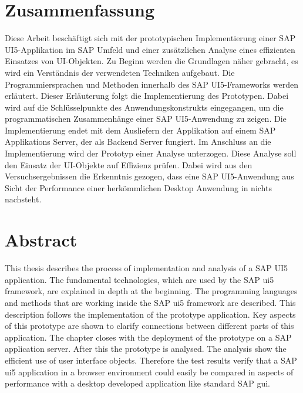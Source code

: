 \section*{Zusammenfassung}
Diese Arbeit beschäftigt sich mit der prototypischen Implementierung einer SAP UI5-Applikation im SAP Umfeld und einer zusätzlichen Analyse eines effizienten Einsatzes von UI-Objekten. Zu Beginn werden die Grundlagen näher gebracht, es wird ein Verständnis der verwendeten Techniken aufgebaut. Die Programmiersprachen und Methoden innerhalb des SAP UI5-Frameworks werden erläutert. Dieser Erläuterung folgt die Implementierung des Prototypen. Dabei wird auf die Schlüsselpunkte des Anwendungskonstrukts eingegangen, um die programmatischen Zusammenhänge einer SAP UI5-Anwendung zu zeigen. Die Implementierung endet mit dem Ausliefern der Applikation auf einem SAP Applikations Server, der als Backend Server fungiert. Im Anschluss an die Implementierung wird der Prototyp einer Analyse unterzogen. Diese Analyse soll den Einsatz der UI-Objekte auf Effizienz prüfen. Dabei wird aus den Versuchsergebnissen die Erkenntnis gezogen, dass eine SAP UI5-Anwendung aus Sicht der Performance einer herkömmlichen Desktop Anwendung in nichts nachsteht.


%


\section*{Abstract}
This thesis describes the process of implementation and analysis of a SAP UI5 application. The fundamental technologies, which are used by the SAP ui5 framework, are explained in depth at the beginning. The programming languages and methods that are working inside the SAP ui5 framework are described. This description follows the implementation of the prototype application. Key aspects of this prototype are shown to clarify connections between different parts of this application. The chapter closes with the deployment of the prototype on a SAP application server. After this the prototype is analysed. The analysis show the efficient use of user interface objects. Therefore the test results verify that a SAP ui5 application in a browser environment could easily be compared in aspects of performance with a desktop developed application like standard SAP gui.